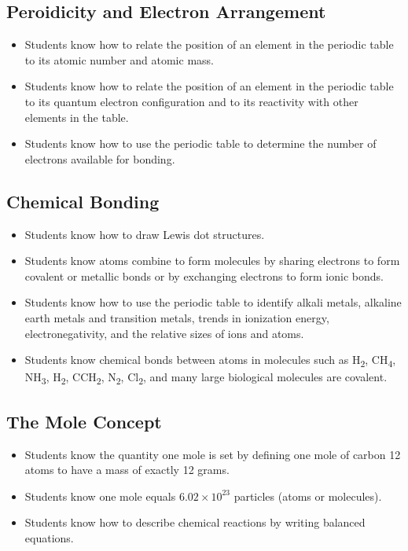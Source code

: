 \documentclass[11pt]{article}
\begin{document}
\subsection{Peroidicity and Electron Arrangement}
\label{sec:org1ebd6b8}
\begin{itemize}
\item Students know how to relate the position of an element in the periodic table to its atomic number and atomic mass.
\item Students know how to relate the position of an element in the periodic table to its quantum electron configuration and to its reactivity with other elements in the table.
\item Students know how to use the periodic table to determine the number of electrons available for bonding.
\end{itemize}
\subsection{Chemical Bonding}
\label{sec:org80a6f5e}
\begin{itemize}
\item Students know how to draw Lewis dot structures.
\item Students know atoms combine to form molecules by sharing electrons to form covalent or metallic bonds or by exchanging electrons to form ionic bonds.
\item Students know how to use the periodic table to identify alkali metals, alkaline earth metals and transition metals, trends in ionization energy, electronegativity, and the relative sizes of ions and atoms.
\item Students know chemical bonds between atoms in molecules such as H\textsubscript{2}, CH\textsubscript{4}, NH\textsubscript{3}, H\textsubscript{2}, CCH\textsubscript{2}, N\textsubscript{2}, Cl\textsubscript{2}, and many large biological molecules are covalent.
\end{itemize}
\subsection{The Mole Concept}
\label{sec:orgce3e0d0}
\begin{itemize}
\item Students know the quantity one mole is set by defining one mole of carbon 12 atoms to have a mass of exactly 12 grams.
\item Students know one mole equals \(6.02 \times 10^{23}\) particles (atoms or molecules).
\item Students know how to describe chemical reactions by writing balanced equations.
\end{itemize}
\end{document}
